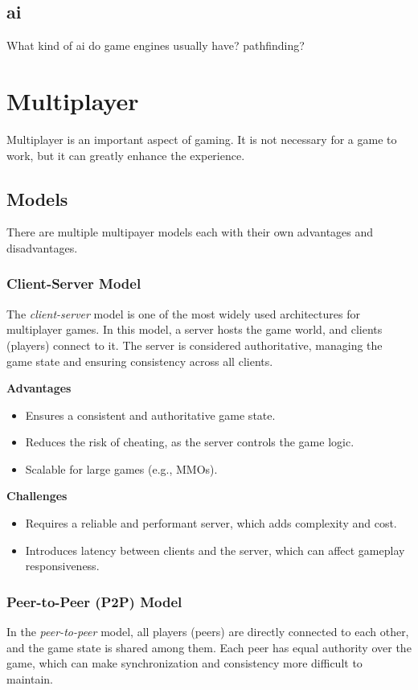 \documentclass{article} %
\begin{document}
\subsection{ai}
What kind of ai do game engines usually have?
pathfinding?
\newpage

\section{Multiplayer}
Multiplayer is an important aspect of gaming. It is not necessary for a game to work, but it can greatly enhance the experience.
\subsection{Models}
There are multiple multipayer models each with their own advantages and disadvantages. \cite{Kroupp_2024}

\subsubsection{Client-Server Model}
The \textit{client-server} model is one of the most widely used architectures for multiplayer games. In this model, a server hosts the game world, and clients (players) connect to it. The server is considered authoritative, managing the game state and ensuring consistency across all clients.

\textbf{Advantages}
\begin{itemize}
    \item Ensures a consistent and authoritative game state.
    \item Reduces the risk of cheating, as the server controls the game logic.
    \item Scalable for large games (e.g., MMOs).
\end{itemize}

\textbf{Challenges}
\begin{itemize}
    \item Requires a reliable and performant server, which adds complexity and cost.
    \item Introduces latency between clients and the server, which can affect gameplay responsiveness.
\end{itemize}

\subsubsection{Peer-to-Peer (P2P) Model}
In the \textit{peer-to-peer} model, all players (peers) are directly connected to each other, and the game state is shared among them. Each peer has equal authority over the game, which can make synchronization and consistency more difficult to maintain.
\end{document}
